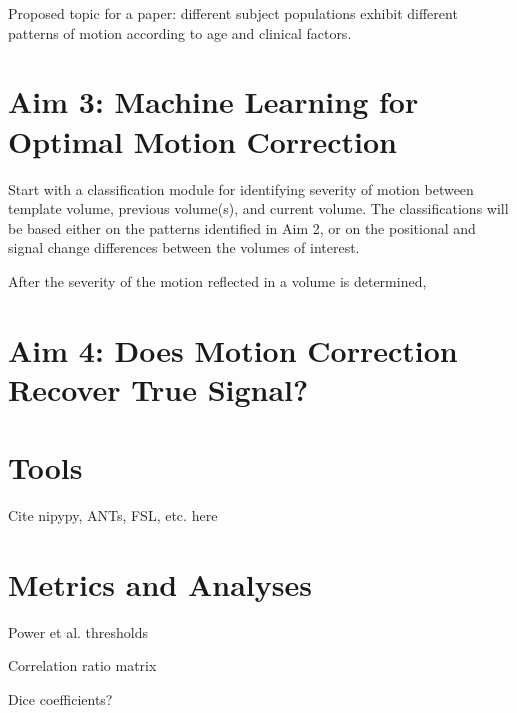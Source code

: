 Proposed topic for a paper: different subject populations exhibit different patterns of motion according to age and clinical factors. 

\section{Aim 3: Machine Learning for Optimal Motion Correction}

Start with a classification module for identifying severity of motion between template volume, previous volume(s), and current volume. The classifications will be based either on the patterns identified in Aim 2, or on the positional and signal change differences between the volumes of interest.

After the severity of the motion reflected in a volume is determined, 

\section{Aim 4: Does Motion Correction Recover True Signal?}


\section{Tools}

Cite nipypy, ANTs, FSL, etc. here

\section{Metrics and Analyses}

Power et al. thresholds

Correlation ratio matrix

Dice coefficients?